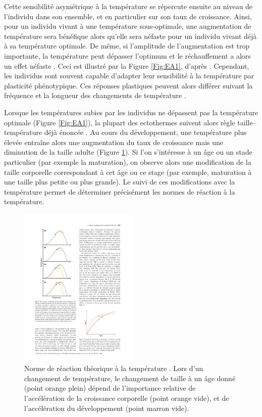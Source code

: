 Cette sensibilité asymétrique à la température se répercute ensuite au niveau
de l'individu dans son ensemble, et en particulier sur son taux de croissance.
Ainsi, pour un individu vivant à une température sous-optimale, une augmentation
de température sera bénéfique alors qu'elle sera néfaste pour un individu vivant
déjà à sa température optimale. De même, si l'amplitude de l'augmentation est
trop importante, la température peut dépasser l'optimum et le réchauffement a
alors un effet néfaste . Ceci est illustré par la Figure
\ref{Fig:EA1}, d'après \textcites{ohlberger2013a}. Cependant, les individus sont
souvent capable d'adapter leur sensibilité à la température par plasticité
phénotypique. Ces réponses plastiques peuvent alors différer suivant la
fréquence et la longueur des changements de température
\autocites{angilletta2009a, huey1999a}.

Lorsque les températures subies par les individus ne dépassent pas la
température optimale (Figure \ref{Fig:EA1}), la plupart des ectothermes suivent
alors règle taille--température déjà énoncée \autocite{atkinson1994a}. Au cours
du développement, une température plus élevée entraîne alors une augmentation du
taux de croissance mais une diminution de la taille adulte (Figure
\ref{Fig:EA2}).
Si l'on s'intéresse à un âge ou un stade particulier (par exemple la
maturation), on observe alors une modification de la taille corporelle
correspondant à cet âge ou ce stage (par exemple, maturation à une taille plus
petite ou plus grande). Le suivi de ces modifications avec la
température permet de déterminer précisément les normes de réaction à la
température.

\begin{figure}[!ht] %
\centering
\includegraphics[width=0.5\textwidth]{1_CorpsDeThese/EA/Fig/ThermalNorm}
\caption[
Norme de réaction à la température]{Norme de réaction théorique à la
température \autocites[Figure 2]{ohlberger2013a}. Lors d'un changement de
température, le changement de taille à un âge donné (point orange plein) dépend
de l'importance relative de l'accélération de la croissance corporelle (point
orange vide), et de l'accélération du développement (point marron vide).}
\label{Fig:EA2}
\end{figure}

